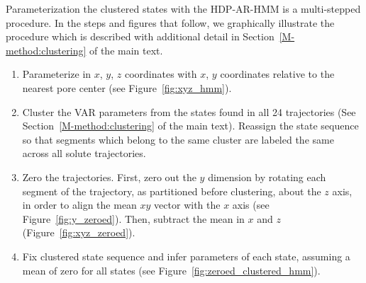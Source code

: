 \documentclass{article}
\begin{document}
  Parameterization the clustered states with the HDP-AR-HMM is a multi-stepped procedure. 
  In the steps and figures that follow, we graphically illustrate the procedure which is
  described with additional detail in Section~\ref{M-method:clustering} of the main text.
  
  \begin{enumerate}
  	\item Parameterize in $x$, $y$, $z$ coordinates with $x$, $y$ coordinates relative to the nearest
  	pore center (see Figure~\ref{fig:xyz_hmm}). 		
  	\item Cluster the VAR parameters from the states found in all 24 trajectories (See 
  	Section~\ref{M-method:clustering} of the main text). Reassign the state sequence so that segments
  	which belong to the same cluster are labeled the same across all solute trajectories.
  	\item Zero the trajectories. First, zero out the $y$ dimension by rotating each segment of 
  	the trajectory, as partitioned before clustering, about the $z$ axis, in order to align the 
  	mean $xy$ vector with the $x$ axis (see Figure~\ref{fig:y_zeroed}). Then, subtract the mean in
  	$x$ and $z$ (Figure~\ref{fig:xyz_zeroed}).
  	\item Fix clustered state sequence and infer parameters of each state, assuming a mean of zero
  	for all states (see Figure~\ref{fig:zeroed_clustered_hmm}). 
  \end{enumerate}
  
\end{document}
